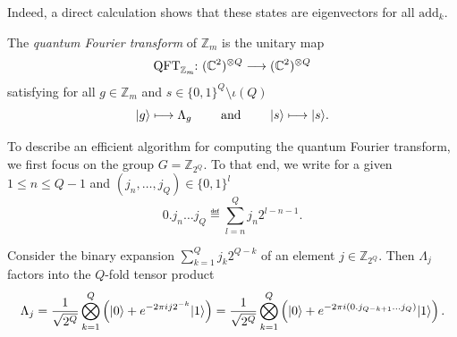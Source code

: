 \documentclass[a4paper, oneside, 12pt]{amsart}
\begin{document}
Indeed, a direct calculation shows that these states are eigenvectors for all \(\mathrm{add}_{k}\).

\begin{definition}\label{def:qft-for-grp}
  The \emph{quantum Fourier transform} of \(\mathbb{Z}_m\) is the unitary map
  \begin{equation}
    \mathrm{QFT}_{ \mathbb{Z}_{m}} \from ( \mathbb{C}^{2})^{\otimes Q} \to ( \mathbb{C}^{2})^{\otimes Q}
  \end{equation}
  satisfying for all \(g\in \mathbb{Z}_{m}\) and \(s\in\{0,1\}^{Q}\setminus \iota(Q)\)
  \begin{equation*}
    \lvert g\rangle \longmapsto \Lambda_{g} \qquad \text{ and }\qquad \lvert s\rangle \longmapsto \lvert s\rangle.
  \end{equation*}
\end{definition}

To describe an efficient algorithm for computing the quantum Fourier transform, we first focus on  the group \(G= \mathbb{Z}_{2^{Q}}\).
To that end, we write for a given \(1\leq n \leq Q-1\) and \((j_{n}, \dots , j_{Q})\in\{0,1\}^{l}\)
\begin{equation}
  0.j_{n}\dots j_{Q} \eqdef \sum_{l=n}^Q j_n 2^{l-n-1}.
\end{equation}

\begin{lemma}
  Consider the binary expansion \(\sum_{k=1}^Q j_k 2^{Q-k}\) of an element \(j\in \mathbb{Z}_{2^{Q}}\).
  Then \(\Lambda_j\) factors into the \(Q\)-fold tensor product
\begin{equation}\label{eq:qft_product}
  \Lambda_j
  =  \frac{1}{\sqrt{2^Q}} \bigotimes_{k=1}^Q \left( \lvert0\rangle + e^{-2\pi i j 2^{-k}} \lvert1\rangle \right)
  = \frac{1}{\sqrt{2^Q}} \bigotimes_{k=1}^Q \left( \lvert0\rangle + e^{-2\pi i (0.j_{Q-k+1}\dots j_{Q})} \lvert1\rangle \right).
\end{equation}
\end{lemma}
\end{document}
